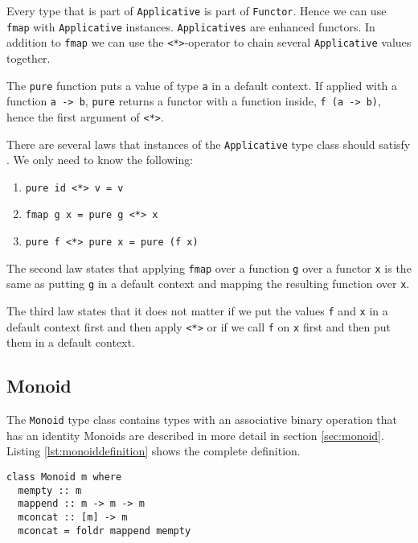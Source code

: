 Every type that is part of \verb|Applicative| is part of \verb|Functor|. Hence we can use \verb|fmap| with \verb|Applicative| instances.
\verb|Applicatives| are enhanced functors. In addition to \verb|fmap| we can use the \verb|<*>|-operator to chain several \verb|Applicative| values together.

The \verb|pure| function puts a value of type \verb|a| in a default context. If applied with a function \verb|a -> b|,  \verb|pure| returns a functor with a function inside, \verb|f (a -> b)|, hence the first argument of \verb|<*>|.

There are several laws that instances of the \verb|Applicative| type class should satisfy \cite{mcbride} \cite{control.applicative}. We only need to know the following:

\begin{enumerate}
\item \verb|pure id <*> v = v|
\item \verb|fmap g x = pure g <*> x|
\item \verb|pure f <*> pure x = pure (f x)|
\end{enumerate}

The second law states that applying \verb|fmap| over a function \verb|g| over a functor \verb|x| is the same as putting \verb|g| in a default context and mapping the resulting function over \verb|x|.

The third law states that it does not matter if we put the values \verb|f| and \verb|x| in a default context first and then apply \verb|<*>| or if we call \verb|f| on \verb|x| first and then put them in a default context. 

\subsection{Monoid}
\label{sec:monoiddefinition}

The \verb|Monoid| type class contains types with an associative binary operation that has an identity
Monoids are described in more detail in section \ref{sec:monoid}. Listing \ref{lst:monoiddefinition} shows the complete definition.
\begin{lstlisting}[label={lst:monoiddefinition}, caption={Definition of type class monoid}]
class Monoid m where
  mempty :: m
  mappend :: m -> m -> m
  mconcat :: [m] -> m
  mconcat = foldr mappend mempty
\end{lstlisting}